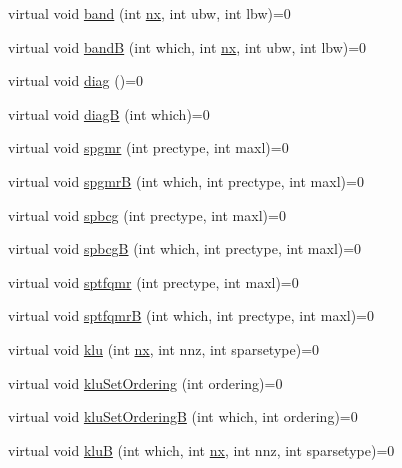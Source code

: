 \begin{DoxyCompactItemize}
\item 
virtual void \mbox{\hyperlink{classamici_1_1_solver_a00863fd76b453dae4e883a6dd5512df3}{band}} (int \mbox{\hyperlink{classamici_1_1_solver_a86a18c4e461de76881b6af72e4feb8d9}{nx}}, int ubw, int lbw)=0
\item 
virtual void \mbox{\hyperlink{classamici_1_1_solver_a635908e6d209f02160e791f3ee9d0660}{bandB}} (int which, int \mbox{\hyperlink{classamici_1_1_solver_a86a18c4e461de76881b6af72e4feb8d9}{nx}}, int ubw, int lbw)=0
\item 
virtual void \mbox{\hyperlink{classamici_1_1_solver_a8c82b886a5a8f4c33218e7345be700e2}{diag}} ()=0
\item 
virtual void \mbox{\hyperlink{classamici_1_1_solver_abaeb82c5ccd678c2c2ce3e4988704c24}{diagB}} (int which)=0
\item 
virtual void \mbox{\hyperlink{classamici_1_1_solver_a41fd75dd5f9bc7363ca1c1079c2d0014}{spgmr}} (int prectype, int maxl)=0
\item 
virtual void \mbox{\hyperlink{classamici_1_1_solver_a466c88dd599259b83fe6140e7a454759}{spgmrB}} (int which, int prectype, int maxl)=0
\item 
virtual void \mbox{\hyperlink{classamici_1_1_solver_ace3159c84746c594a0fb6a5f00773c44}{spbcg}} (int prectype, int maxl)=0
\item 
virtual void \mbox{\hyperlink{classamici_1_1_solver_a9b165bfcf1a6a482a6c9bd84197df6e2}{spbcgB}} (int which, int prectype, int maxl)=0
\item 
virtual void \mbox{\hyperlink{classamici_1_1_solver_ad58de0bff9b336ed3a053a79fb8e6c80}{sptfqmr}} (int prectype, int maxl)=0
\item 
virtual void \mbox{\hyperlink{classamici_1_1_solver_a4504b729da34114dd11eab83161c5670}{sptfqmrB}} (int which, int prectype, int maxl)=0
\item 
virtual void \mbox{\hyperlink{classamici_1_1_solver_a4d8be62dca7f7db6563b9b3261a44c01}{klu}} (int \mbox{\hyperlink{classamici_1_1_solver_a86a18c4e461de76881b6af72e4feb8d9}{nx}}, int nnz, int sparsetype)=0
\item 
virtual void \mbox{\hyperlink{classamici_1_1_solver_a30d4c8cfff0c6a74116b15bcfeecbd33}{klu\+Set\+Ordering}} (int ordering)=0
\item 
virtual void \mbox{\hyperlink{classamici_1_1_solver_aa24ecf586126da19bb338ec8d08fe323}{klu\+Set\+OrderingB}} (int which, int ordering)=0
\item 
virtual void \mbox{\hyperlink{classamici_1_1_solver_a5f9c6152e6e01f631cd5b68fd638281c}{kluB}} (int which, int \mbox{\hyperlink{classamici_1_1_solver_a86a18c4e461de76881b6af72e4feb8d9}{nx}}, int nnz, int sparsetype)=0

\end{DoxyCompactItemize}
